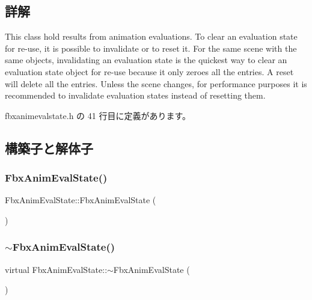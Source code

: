 \subsection{詳解}
This class hold results from animation evaluations. To clear an evaluation state for re-\/use, it is possible to invalidate or to reset it. For the same scene with the same objects, invalidating an evaluation state is the quickest way to clear an evaluation state object for re-\/use because it only zeroes all the entries. A reset will delete all the entries. Unless the scene changes, for performance purposes it is recommended to invalidate evaluation states instead of resetting them. 

 fbxanimevalstate.\+h の 41 行目に定義があります。



\subsection{構築子と解体子}
\mbox{\label{class_fbx_anim_eval_state_a580a41fcddf592e7c4466a26648392c1}} 
\subsubsection{\texorpdfstring{Fbx\+Anim\+Eval\+State()}{FbxAnimEvalState()}}
{\footnotesize\ttfamily Fbx\+Anim\+Eval\+State\+::\+Fbx\+Anim\+Eval\+State (\begin{DoxyParamCaption}{ }\end{DoxyParamCaption})}

\mbox{\label{class_fbx_anim_eval_state_a571cadbab0fda535e1b0a5f650307342}} 
\subsubsection{\texorpdfstring{$\sim$\+Fbx\+Anim\+Eval\+State()}{~FbxAnimEvalState()}}
{\footnotesize\ttfamily virtual Fbx\+Anim\+Eval\+State\+::$\sim$\+Fbx\+Anim\+Eval\+State (\begin{DoxyParamCaption}{ }\end{DoxyParamCaption})\hspace{0.3cm}{\ttfamily [virtual]}}



